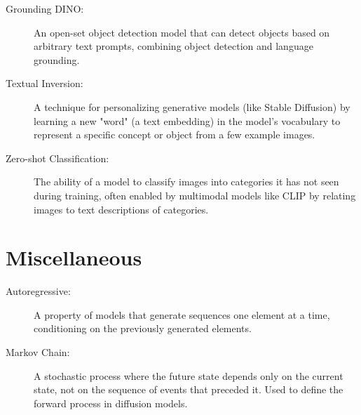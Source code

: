 \begin{description}
  \item[Grounding DINO:] An open-set object detection model that can detect objects based on arbitrary text prompts, combining object detection and language grounding.
  \item[Textual Inversion:] A technique for personalizing generative models (like Stable Diffusion) by learning a new "word" (a text embedding) in the model's vocabulary to represent a specific concept or object from a few example images.
  \item[Zero-shot Classification:] The ability of a model to classify images into categories it has not seen during training, often enabled by multimodal models like CLIP by relating images to text descriptions of categories.
\end{description}

\section{Miscellaneous}

\begin{description}
  \item[Autoregressive:] A property of models that generate sequences one element at a time, conditioning on the previously generated elements.
  \item[Markov Chain:] A stochastic process where the future state depends only on the current state, not on the sequence of events that preceded it. Used to define the forward process in diffusion models.
\end{description}

